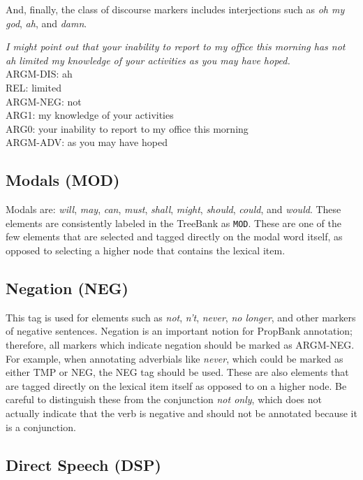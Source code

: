\documentclass[11pt]{report}
\begin{document}
And, finally, the class of discourse markers includes interjections such as \textit{oh my god}, \textit{ah}, and \textit{damn}. 

\textit{I might point out that your inability to report to my office this morning has not ah limited my knowledge of your activities as you may have hoped.}\\
ARGM-DIS: ah\\
REL:	limited\\
ARGM-NEG: not\\
ARG1:	my knowledge of your activities\\
ARG0:	your inability to report to my office this morning\\
ARGM-ADV: as you may have hoped

\subsection{Modals (MOD)}
\label{ssec: MOD}

Modals are: \textit{will}, \textit{may}, \textit{can}, \textit{must}, \textit{shall}, \textit{might}, \textit{should}, \textit{could}, and \textit{would}.  These elements are consistently labeled in the TreeBank as \texttt{MOD}.  These are one of the few elements that are selected and tagged directly on the modal word itself, as opposed to selecting a higher node that contains the lexical item.  

\subsection{Negation (NEG)}
\label{ssec: NEG}

This tag is used for elements such as \textit{not},  \textit{n't}, \textit{never}, \textit{no longer}, and other markers of negative sentences. Negation is an important notion for PropBank annotation; therefore, all markers which indicate negation should be marked as ARGM-NEG. For example, when annotating adverbials like \textit{never}, which could be marked as either TMP or NEG, the NEG tag should be used.  These are also elements that are tagged directly on the lexical item itself as opposed to on a higher node.  Be careful to distinguish these from the conjunction \textit{not only}, which does not actually indicate that the verb is negative and should not be annotated because it is a conjunction.

\subsection{Direct Speech (DSP)}
\label{ssec: DSP}
\end{document}
